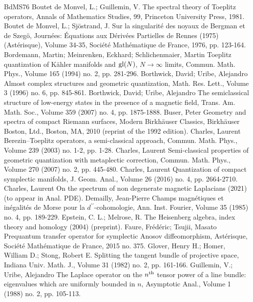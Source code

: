 \begin{thebibliography}{BdMS76}
 Boutet de Monvel, L.; Guillemin, V. The spectral theory of Toeplitz operators, Annals of Mathematics Studies, 99, Princeton University Press, 1981.
 Boutet de Monvel, L.; Sjöstrand, J. Sur la singularité des noyaux de Bergman et de Szegö, Journées: Équations aux Dérivées Partielles de Rennes (1975) (Astérisque), Volume 34-35, Société Mathématique de France, 1976, pp. 123-164.
 Bordemann, Martin; Meinrenken, Eckhard; Schlichenmaier, Martin Toeplitz quantization of Kähler manifolds and ${\rm gl}({N})$, ${N}\rightarrow \infty $ limits, Commun. Math. Phys., Volume 165 (1994) no. 2, pp. 281-296.
 Borthwick, David; Uribe, Alejandro Almost complex structures and geometric quantization, Math. Res. Lett., Volume 3 (1996) no. 6, pp. 845-861.
 Borthwick, David; Uribe, Alejandro The semiclassical structure of low-energy states in the presence of a magnetic field, Trans. Am. Math. Soc., Volume 359 (2007) no. 4, pp. 1875-1888.
 Buser, Peter Geometry and spectra of compact Riemann surfaces, Modern Birkhäuser Classics, Birkhäuser Boston, Ltd., Boston, MA, 2010 (reprint of the 1992 edition).
 Charles, Laurent Berezin–Toeplitz operators, a semi-classical approach, Commun. Math. Phys., Volume 239 (2003) no. 1-2, pp. 1-28.
 Charles, Laurent Semi-classical properties of geometric quantization with metaplectic correction, Commun. Math. Phys., Volume 270 (2007) no. 2, pp. 445-480.
 Charles, Laurent Quantization of compact symplectic manifolds, J. Geom. Anal., Volume 26 (2016) no. 4, pp. 2664-2710.
 Charles, Laurent On the spectrum of non degenerate magnetic Laplacians (2021) (to appear in Anal. PDE).
 Demailly, Jean-Pierre Champs magnétiques et inégalités de Morse pour la $d^{\prime \prime }$-cohomologie, Ann. Inst. Fourier, Volume 35 (1985) no. 4, pp. 189-229.
 Epstein, C. L.; Melrose, R. The Heisenberg algebra, index theory and homology (2004) (preprint).
 Faure, Frédéric; Tsujii, Masato Prequantum transfer operator for symplectic Anosov diffeomorphism, Astérisque, Société Mathématique de France, 2015 no. 375.
 Glover, Henry H.; Homer, William D.; Stong, Robert E. Splitting the tangent bundle of projective space, Indiana Univ. Math. J., Volume 31 (1982) no. 2, pp. 161-166.
 Guillemin, V.; Uribe, Alejandro The Laplace operator on the $n^{\rm th}$ tensor power of a line bundle: eigenvalues which are uniformly bounded in $n$, Asymptotic Anal., Volume 1 (1988) no. 2, pp. 105-113.

\end{thebibliography}
